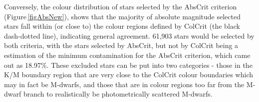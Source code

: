 Conversely, the colour distribution of stars selected by the AbsCrit criterion (Figure\,\ref{figAbsNew}), shows that the majority of absolute magnitude selected stars fall within (or close to) the colour regions defined by ColCrit (the black dash-dotted line), indicating general agreement. 61,903 stars would be selected by both criteria, with the stars selected by AbsCrit, but not by ColCrit being a estimation of the minimum contamination for the AbsCrit criterion, which came out as 18.97\%. These excluded stars can be put into two categories - those in the K/M boundary region that are very close to the ColCrit colour boundaries which may in fact be M-dwarfs, and those that are in colour regions too far from the M-dwarf branch to realistically be photometrically scattered M-dwarfs.\\

